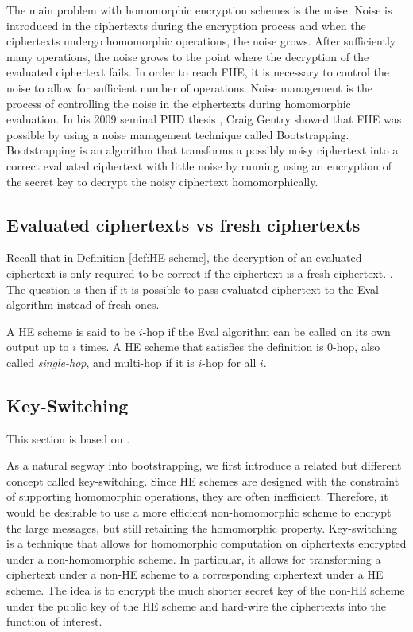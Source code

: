The main problem with homomorphic encryption schemes is the noise. Noise is introduced in the ciphertexts during the encryption process and when the ciphertexts undergo homomorphic operations, the noise grows. After sufficiently many operations, the noise grows to the point where the decryption of the evaluated ciphertext fails. In order to reach FHE, it is necessary to control the noise to allow for sufficient number of operations. Noise management is the process of controlling the noise in the ciphertexts during homomorphic evaluation. In his 2009 seminal PHD thesis \cite{Gentry-Thesis}, Craig Gentry showed that FHE was possible by using a noise management technique called Bootstrapping. Bootstrapping is an algorithm that transforms a possibly noisy ciphertext into a correct evaluated ciphertext with little noise by running using an encryption of the secret key to decrypt the noisy ciphertext homomorphically.

\subsection*{Evaluated ciphertexts vs fresh ciphertexts}
Recall that in Definition \ref{def:HE-scheme}, the decryption of an evaluated ciphertext is only required to be correct if the ciphertext is a fresh ciphertext. . The question is then if it is possible to pass evaluated ciphertext to the Eval algorithm instead of fresh ones.

A HE scheme is said to be $i$-hop if the Eval algorithm can be called on its own output up to $i$ times. A HE scheme that satisfies the definition is $0$-hop, also called \textit{single-hop}, and multi-hop if it is $i$-hop for all $i$. 

\subsection*{Key-Switching}
This section is based on \cite{Bra18-survey}.

As a natural segway into bootstrapping, we first introduce a related but different concept called key-switching. Since HE schemes are designed with the constraint of supporting homomorphic operations, they are often inefficient. Therefore, it would be desirable to use a more efficient non-homomorphic scheme to encrypt the large messages, but still retaining the homomorphic property. Key-switching is a technique that allows for homomorphic computation on ciphertexts encrypted under a non-homomorphic scheme. In particular, it allows for transforming a ciphertext under a non-HE scheme to a corresponding ciphertext under a HE scheme. The idea is to encrypt the much shorter secret key of the non-HE scheme under the public key of the HE scheme and hard-wire the ciphertexts into the function of interest.

